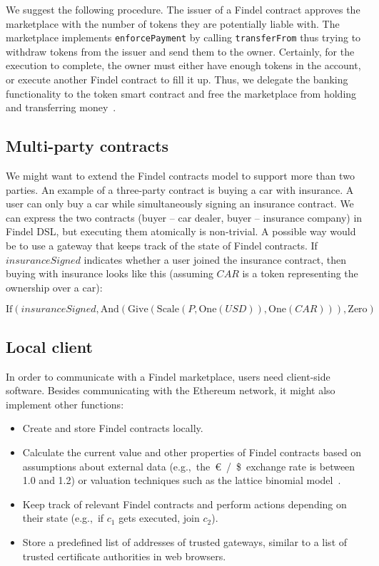 We suggest the following procedure.
The issuer of a Findel contract approves the marketplace with the number of tokens they are potentially liable with.
The marketplace implements \texttt{enforcePayment} by calling \texttt{transferFrom} thus trying to withdraw tokens from the issuer and send them to the owner.
Certainly, for the execution to complete, the owner must either have enough tokens in the account, or execute another Findel contract to fill it up.
Thus, we delegate the banking functionality to the token smart contract and free the marketplace from holding and transferring money~\cite{Khovratovich2016}.


\subsection{Multi-party contracts}

We might want to extend the Findel contracts model to support more than two parties.
An example of a three-party contract is buying a car with insurance.
A user can only buy a car while simultaneously signing an insurance contract.
We can express the two contracts (buyer -- car dealer, buyer -- insurance company) in Findel DSL, but executing them atomically is non-trivial.
A possible way would be to use a gateway that keeps track of the state of Findel contracts.
If \(insuranceSigned\) indicates whether a user joined the insurance contract, then buying with insurance looks like this (assuming \(CAR\) is a token representing the ownership over a car):

\[\mathrm{If}(insuranceSigned,\mathrm{And}(\mathrm{Give}(\mathrm{Scale}(P,\mathrm{One}(USD)),\mathrm{One}(CAR))),\mathrm{Zero})\]


\subsection{Local client}

In order to communicate with a Findel marketplace, users need client-side software.
Besides communicating with the Ethereum network, it might also implement other functions:
\begin{itemize}
	\item Create and store Findel contracts locally.
	\item Calculate the current value and other properties of Findel contracts based on assumptions about external data (e.g.,~the~\euro~/~\$~exchange rate is between 1.0 and 1.2) or valuation techniques such as the lattice binomial model~\cite{Cox1979}.
	\item Keep track of relevant Findel contracts and perform actions depending on their state (e.g.,~if \(c_1\) gets executed, join \(c_2\)).
	\item Store a predefined list of addresses of trusted gateways, similar to a list of trusted certificate authorities in web browsers.
\end{itemize}


